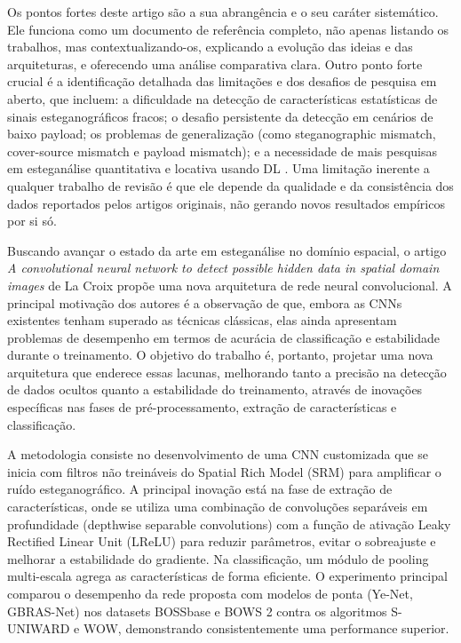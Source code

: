 \documentclass[12pt]{article}
\begin{document}
Os pontos fortes deste artigo são a sua abrangência e o seu caráter
sistemático. Ele funciona como um documento de referência completo, não apenas
listando os trabalhos, mas contextualizando-os, explicando a evolução das
ideias e das arquiteturas, e oferecendo uma análise comparativa clara. Outro
ponto forte crucial é a identificação detalhada das limitações e dos desafios
de pesquisa em aberto, que incluem: a dificuldade na detecção de
características estatísticas de sinais esteganográficos fracos; o desafio
persistente da detecção em cenários de baixo payload; os problemas de
generalização (como steganographic mismatch, cover-source mismatch e payload
mismatch); e a necessidade de mais pesquisas em esteganálise quantitativa e
locativa usando DL \cite{farooq2023systematic}. Uma limitação inerente a
qualquer trabalho de revisão é que ele depende da qualidade e da consistência
dos dados reportados pelos artigos originais, não gerando novos resultados
empíricos por si só.

Buscando avançar o estado da arte em esteganálise no domínio espacial, o artigo
\textit{A convolutional neural network to detect possible hidden data in
  spatial domain images} de La Croix \cite{croix2023CNN} propõe uma nova
arquitetura de rede neural convolucional. A principal motivação dos autores é a
observação de que, embora as CNNs existentes tenham superado as técnicas
clássicas, elas ainda apresentam problemas de desempenho em termos de acurácia
de classificação e estabilidade durante o treinamento. O objetivo do trabalho
é, portanto, projetar uma nova arquitetura que enderece essas lacunas,
melhorando tanto a precisão na detecção de dados ocultos quanto a estabilidade
do treinamento, através de inovações específicas nas fases de
pré-processamento, extração de características e classificação.

A metodologia consiste no desenvolvimento de uma CNN customizada que se inicia
com filtros não treináveis do Spatial Rich Model (SRM) para amplificar o ruído
esteganográfico. A principal inovação está na fase de extração de
características, onde se utiliza uma combinação de convoluções separáveis em
profundidade (depthwise separable convolutions) com a função de ativação Leaky
Rectified Linear Unit (LReLU) para reduzir parâmetros, evitar o sobreajuste e
melhorar a estabilidade do gradiente. Na classificação, um módulo de pooling
multi-escala agrega as características de forma eficiente. O experimento
principal comparou o desempenho da rede proposta com modelos de ponta (Ye-Net,
GBRAS-Net) nos datasets BOSSbase e BOWS 2 contra os algoritmos S-UNIWARD e WOW,
demonstrando consistentemente uma performance superior.
\end{document}
